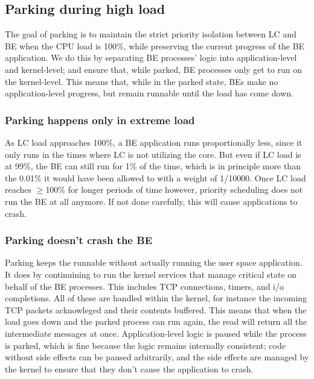 \subsection{Parking during high load}\label{ss:approach:parking}

The goal of parking is to maintain the strict priority isolation between LC and
BE when the CPU load is 100\%, while preserving the current progress of the BE
application. We do this by separating BE processes' logic into application-level
and kernel-level; and ensure that, while parked, BE processes only get to run on
the kernel-level. This means that, while in the parked state, BEs make no
application-level progress, but remain runnable until the load has come down.

\subsubsection{Parking happens only in extreme load}
As LC load approaches 100\%, a BE application runs proportionally less, since it
only runs in the times where LC is not utilizing the core. But even if LC load
is at 99\%, the BE can still run for 1\% of the time, which is in principle more
than the 0.01\% it would have been allowed to with a weight of 1/10000. Once LC
load reaches $\geq$100\% for longer periods of time however, priority scheduling
does not run the BE at all anymore. If not done carefully, this will cause
applications to crash.

\subsubsection{Parking doesn't crash the BE}
Parking keeps the runnable without actually running the user space application.
It does by continuining to run the kernel services that manage critical state on
behalf of the BE processes. This includes TCP connections, timers, and i/o
completions. All of these are handled within the kernel, for instance the
incoming TCP packets acknowleged and their contents buffered. This means that
when the load goes down and the parked process can run again, the read will
return all the intermediate messages at once. Application-level logic is paused
while the process is parked, which is fine because the logic remains internally
consistent; code without side effects can be paused arbitrarily, and the side
effects are managed by the kernel to ensure that they don't cause the
application to crash.

